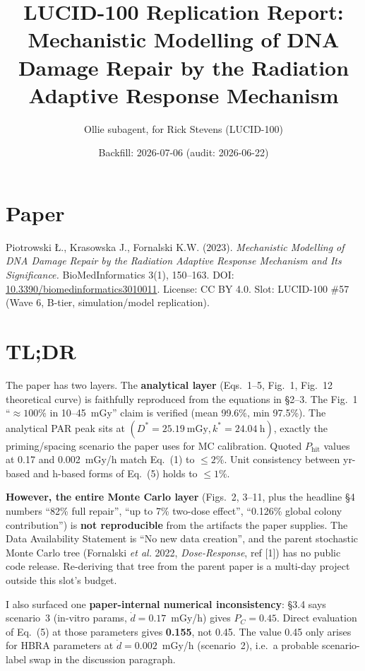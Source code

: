 \documentclass[11pt]{article}
\title{LUCID-100 Replication Report: \\
Mechanistic Modelling of DNA Damage Repair by the Radiation Adaptive Response Mechanism}
\author{Ollie subagent, for Rick Stevens (LUCID-100)}
\date{Backfill: 2026-07-06 (audit: 2026-06-22)}
\begin{document}
\maketitle

\section*{Paper}
Piotrowski \L., Krasowska J., Fornalski K.W. (2023). \emph{Mechanistic Modelling of DNA
Damage Repair by the Radiation Adaptive Response Mechanism and Its Significance.}
BioMedInformatics 3(1), 150--163. DOI:
\href{https://doi.org/10.3390/biomedinformatics3010011}{10.3390/biomedinformatics3010011}.
License: CC BY 4.0. Slot: LUCID-100 \#57 (Wave 6, B-tier, simulation/model replication).

\section{TL;DR}
The paper has two layers. The \textbf{analytical layer} (Eqs.~1--5, Fig.~1, Fig.~12
theoretical curve) is faithfully reproduced from the equations in \S2--3. The
Fig.~1 ``$\approx 100\%$ in 10--45~mGy'' claim is verified (mean 99.6\%, min 97.5\%).
The analytical PAR peak sits at $(D^{*}=25.19~\text{mGy}, k^{*}=24.04~\text{h})$,
exactly the priming/spacing scenario the paper uses for MC calibration.
Quoted $P_{\text{hit}}$ values at 0.17 and 0.002~mGy/h match Eq.~(1) to $\le 2\%$.
Unit consistency between yr-based and h-based forms of Eq.~(5) holds to $\le 1\%$.

\textbf{However, the entire Monte Carlo layer} (Figs.~2, 3--11, plus the headline \S4
numbers ``82\% full repair'', ``up to 7\% two-dose effect'', ``0.126\% global colony
contribution'') is \textbf{not reproducible} from the artifacts the paper supplies. The
Data Availability Statement is ``No new data creation'', and the parent stochastic
Monte Carlo tree (Fornalski \emph{et al.} 2022, \emph{Dose-Response}, ref [1]) has no
public code release. Re-deriving that tree from the parent paper is a multi-day project
outside this slot's budget.

I also surfaced one \textbf{paper-internal numerical inconsistency}: \S3.4 says
scenario~3 (in-vitro params, $\dot{d}=0.17$~mGy/h) gives $P_C=0.45$. Direct evaluation
of Eq.~(5) at those parameters gives \textbf{0.155}, not 0.45. The value 0.45 only arises
for HBRA parameters at $\dot{d}=0.002$~mGy/h (scenario~2), i.e.\ a probable
scenario-label swap in the discussion paragraph.
\end{document}
